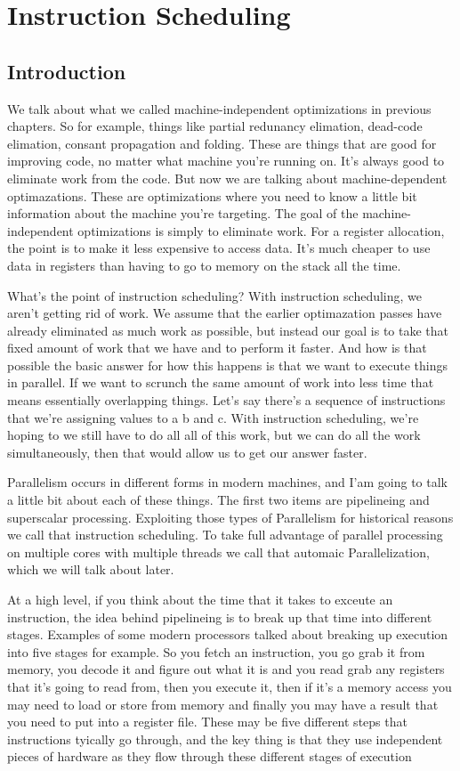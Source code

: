\section{Instruction Scheduling}
\subsection{Introduction}
We talk about what we called
machine-independent optimizations in previous chapters. So for example, things like
partial redunancy elimation, dead-code elimation, consant propagation and 
folding. These are things that are good for improving code, no matter
what machine you're running on. It's always good to eliminate work
from the code. But now we are talking about machine-dependent optimazations.
These are optimizations where you need to know a little bit information
about the machine you're targeting. The goal of the machine-independent
optimizations is simply to eliminate work. For a register allocation, the point
is to make it less expensive to access data. It's much cheaper to use data in 
registers than having to go to memory on the stack all the time. 

What's the point of instruction scheduling? With instruction scheduling, 
we aren't getting rid of work. We assume that the earlier optimazation passes have 
already eliminated as much work as possible, but instead our goal is to take that 
fixed amount of work that we have and to perform it faster. And how is that possible
the basic answer for how this happens is that we want to execute things in parallel.
If we want to scrunch the same amount of work into less time that means essentially
overlapping things. Let's say there's a sequence of instructions that we're assigning 
values to a b and c. With instruction scheduling, we're hoping to we still have to do all
all of this work, but we can do all the work simultaneously, then that would allow 
us to get our answer faster. 

Parallelism occurs in different forms in modern machines, and I'am going to talk a little
bit about each of these things. The first two items are pipelineing and superscalar 
processing. Exploiting those types of Parallelism for historical reasons we call that 
instruction scheduling. To take full advantage of parallel processing on multiple cores
with multiple threads we call that automaic Parallelization, which we will talk about
later. 

At a high level, if you think about the time that it takes to exceute an instruction,
the idea behind pipelineing is to break up that time into different stages.
Examples of some modern processors talked about breaking up execution into five 
stages for example. So you fetch an instruction, you go grab it from memory, you 
decode it and figure out what it is and you read grab any registers that it's going to read
from, then you execute it, then if it's a memory access you may need to load or store
from memory and finally you may have a result that you need to put into a register file.
These may be five different steps that instructions tyically go through, and the key thing is 
that they use independent pieces of hardware as they flow through these different stages of execution

